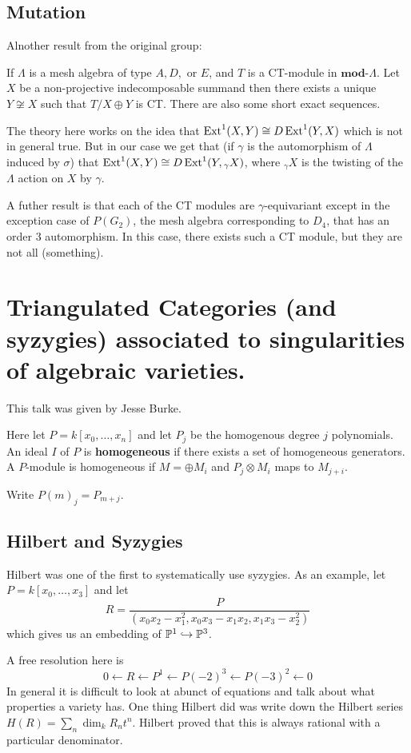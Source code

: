 \documentclass[12pt]{article}
\begin{document}
\subsection{Mutation}
Alnother result from the original group:
\begin{thm}[GLS]
	If $\Lambda$ is a mesh algebra of type $A,D,$ or $E$, and $T$ is a CT-module in $\mathbf{mod}$-$\Lambda$. Let $X$ be a non-projective indecomposable 
	summand  then there exists a unique $Y\not\cong X$ such that $T/X\oplus Y$ is CT. There are also some short exact sequences.
\end{thm}

The theory here works on the idea that $\operatorname{Ext}^1(X,Y)\cong D\operatorname{Ext}^1(Y,X)$ which is not in general true. But in our case 
we get that (if $\gamma$ is the automorphism of $\Lambda$ induced by $\sigma$) that $\operatorname{Ext}^1(X,Y)\cong D\operatorname{Ext}^1(Y,{_\gamma}X)$, where 
${_\gamma}X$ is the twisting of the $\Lambda$ action on $X$ by $\gamma$.

A futher result is that each of the CT modules are $\gamma$-equivariant except in the exception case of $P(G_2)$, the mesh algebra 
corresponding to $D_4$, that has an order 3 automorphism. In this case, there exists such a CT module, but they are not all (something).

\section{Triangulated Categories (and syzygies) associated to singularities of algebraic varieties.}
This talk was given by Jesse Burke.

Here let $P=k[x_0,\dots,x_n]$ and let $P_j$ be the homogenous degree $j$ polynomials. An ideal $I$ of $P$ is \textbf{homogeneous} if there 
exists a set of homogeneous generators. A $P$-module is homogeneous if $M=\oplus M_i$ and $P_j\otimes M_i$ maps to $M_{j+i}$.

Write $P(m)_j=P_{m+j}$.

\subsection{Hilbert and Syzygies}
Hilbert was one of the first to systematically use syzygies. As an example, let $P=k[x_0,\dots,x_3]$ and let
\[R=\frac{P}{(x_0x_2-x_1^2,x_0x_3-x_1x_2,x_1x_3-x_2^2)}\]
which gives us an embedding of $\mathbb{P}^1\hookrightarrow\mathbb{P}^3$.

A free resolution here is 
\[0\leftarrow R\leftarrow P^1\leftarrow P(-2)^3\leftarrow P(-3)^2\leftarrow 0\]
In general it is difficult to look at abunct of equations and talk about what properties a variety has. One thing Hilbert did was 
write down the Hilbert series $H(R)=\sum_n \dim_k R_nt^n$. Hilbert proved that this is always rational with a particular denominator.
\end{document}

